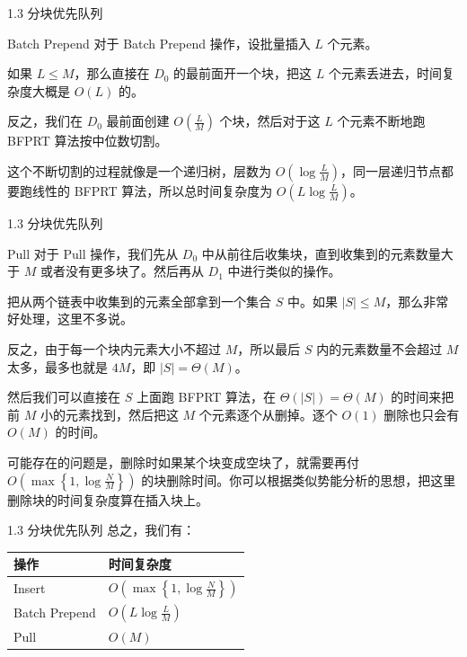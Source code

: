 \documentclass{beamer}
\begin{document}
\begin{frame}{1.3 分块优先队列}
  \begin{block}{Batch Prepend}
    对于 Batch Prepend 操作，设批量插入 $L$ 个元素。

    \vspace{0.35em}\pause
    如果 $L\le M$，那么直接在 $D_{0}$ 的最前面开一个块，把这 $L$ 个元素丢进去，时间复杂度大概是 $O(L)$ 的。
  
    \vspace{0.35em}\pause
    反之，我们在 $D_0$ 最前面创建 $O(\frac{L}{M})$ 个块，然后对于这 $L$ 个元素不断地跑 BFPRT 算法按中位数切割。
    
    \vspace{0.35em}
    这个不断切割的过程就像是一个递归树，层数为 $O(\log \frac{L}{M})$，同一层递归节点都要跑线性的 BFPRT 算法，所以总时间复杂度为 $O(L\log \frac{L}{M})$。
  \end{block}
\end{frame}

\begin{frame}{1.3 分块优先队列}
  \begin{block}{Pull}
    \footnotesize
    对于 Pull 操作，我们先从 $D_0$ 中从前往后收集块，直到收集到的元素数量大于 $M$ 或者没有更多块了。然后再从 $D_1$ 中进行类似的操作。

    \vspace{0.35em}\pause
    把从两个链表中收集到的元素全部拿到一个集合 $S$ 中。如果 $|S| \le M$，那么非常好处理，这里不多说。
  
    \vspace{0.35em}\pause
    反之，由于每一个块内元素大小不超过 $M$，所以最后 $S$ 内的元素数量不会超过 $M$ 太多，最多也就是 $4M$，即 $|S|=\Theta(M)$。
  
    \vspace{0.35em}\pause
    然后我们可以直接在 $S$ 上面跑 BFPRT 算法，在 $\Theta(|S|)=\Theta(M)$ 的时间来把前 $M$ 小的元素找到，然后把这 $M$ 个元素逐个从删掉。逐个 $O(1)$ 删除也只会有 $O(M)$ 的时间。
  
    \vspace{0.35em}\pause
    可能存在的问题是，删除时如果某个块变成空块了，就需要再付 $O(\max\left\{ 1, \log \frac{N}{M} \right\})$ 的块删除时间。你可以根据类似势能分析的思想，把这里删除块的时间复杂度算在插入块上。
  \end{block}
\end{frame}

\begin{frame}{1.3 分块优先队列}
  总之，我们有：
  \begin{center}\small
    \begin{tabular}{@{}l@{\qquad}l@{}}
      \toprule
      操作 & 时间复杂度 \\
      \midrule
      Insert & $O(\max\left\{ 1, \log \frac{N}{M} \right\})$ \\
      Batch Prepend & $O(L\log \frac{L}{M})$ \\
      Pull & $O(M)$ \\
      \bottomrule
    \end{tabular}
  \end{center}
\end{frame}
\end{document}
